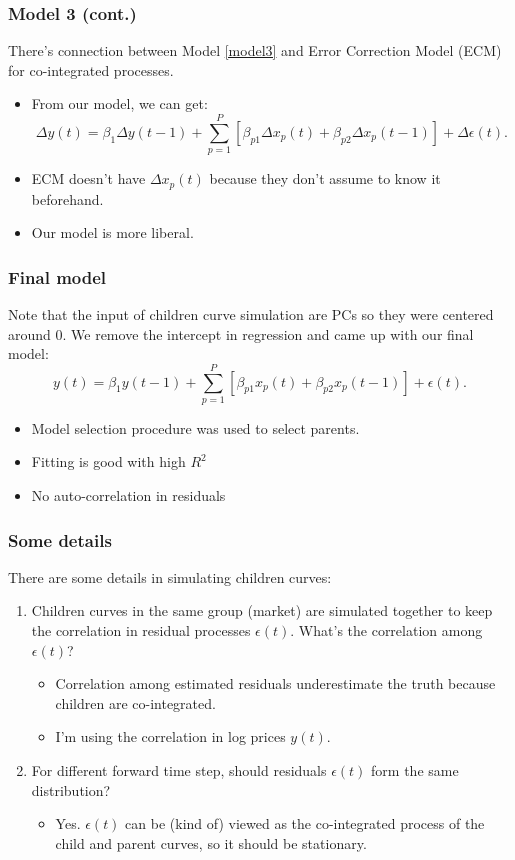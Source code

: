 \documentclass[10pt]{beamer}
\begin{document}
\frame
{
  \frametitle{Model 3 (cont.)}
There's connection between Model \ref{model3} and Error Correction Model (ECM)
for co-integrated processes. 

\begin{itemize}
\item From our model, we can get:
\[\Delta y(t) = \beta_1 \Delta y(t-1) +
\sum_{p=1}^P [\beta_{p1} \Delta x_p(t) + \beta_{p2} \Delta x_p(t-1)] +
\Delta \epsilon(t). \]
\item ECM doesn't have $\Delta x_p(t)$ because they don't assume to know
it beforehand. 
\item Our model is more liberal.
\end{itemize}
}

\frame
{
  \frametitle{Final model}
Note that the input of children curve simulation are PCs 
so they were centered around 0. We remove the intercept
in regression and came up with our final model:
\begin{equation}
  y(t)=\beta_1 y(t-1) +
\sum_{p=1}^P [\beta_{p1} x_p(t) + \beta_{p2} x_p(t-1) ] + \epsilon(t).
\label{model4}
\end{equation}

\begin{itemize}
\item Model selection procedure was used to select parents. 
\item Fitting is good with high $R^2$
\item No auto-correlation in residuals
\end{itemize}
}


\frame
{
  \frametitle{Some details}
There are some details in simulating children curves:
\begin{enumerate}
\item Children curves in the same group (market) are 
simulated together to keep the correlation in 
residual processes $\epsilon(t)$. What's the correlation
among $\epsilon(t)$?
\begin{itemize}
\item Correlation among estimated residuals underestimate
the truth because children are co-integrated. 
\item I'm using the correlation in log prices $y(t)$. 
\end{itemize} 

\item For different forward time step, should 
residuals $\epsilon(t)$ form the same distribution?
\begin{itemize}
\item Yes. $\epsilon(t)$
can be (kind of) viewed  as the co-integrated
process of the child and parent curves, so it should be
stationary.
\end{itemize} 

\end{enumerate}
}
\end{document}
